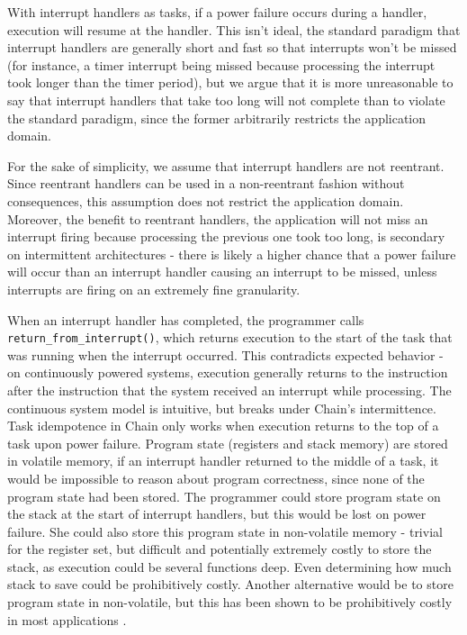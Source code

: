 \documentclass[11pt]{sensys-proc}
\newcommand{\chain}{Chain\xspace}
\begin{document}
With interrupt handlers as tasks, if a power failure occurs during a
handler, execution will resume at the handler. This isn't ideal, the
standard paradigm that interrupt handlers are generally short and fast
so that interrupts won't be missed (for instance, a timer interrupt
being missed because processing the interrupt took longer than the
timer period), but we argue that it is more unreasonable to say
that interrupt handlers that take too long will not complete than
to violate the standard paradigm, since the former arbitrarily restricts
the application domain.


For the sake of simplicity, we assume that interrupt handlers are not
reentrant. Since reentrant handlers can be used in a non-reentrant fashion
without consequences, this assumption does not restrict the application domain.
Moreover, the benefit to reentrant handlers, the application will not miss an
interrupt firing because processing the previous one took too long, is
secondary on intermittent architectures - there is likely a higher chance that
a power failure will occur than an interrupt handler causing an interrupt to be
missed, unless interrupts are firing on an extremely fine granularity.


When an interrupt handler has completed, the programmer calls
\texttt{return\_from\_interrupt()}, which returns execution to the start
of the task that was running when the interrupt occurred. This contradicts
expected behavior - on continuously powered systems, execution generally
returns to the instruction after the instruction that the system received an
interrupt while processing. The continuous system model is intuitive, but
breaks under \chain's intermittence. Task idempotence in \chain only works
when execution returns to the top of a task upon power failure. Program state
(registers and stack memory) are stored
in volatile memory, if an interrupt handler returned to the middle of a task,
it would be impossible to reason about program correctness, since none of the
program state had been stored. The programmer could store program state on the
stack at the start of interrupt handlers, but this would be lost on power
failure. She could also store this program state in non-volatile memory -
trivial for the register set, but difficult and potentially extremely costly to
store the stack, as execution could be several functions deep. Even determining
how much stack to save could be prohibitively costly. Another alternative would
be to store program state in non-volatile, but this has been shown to be
prohibitively costly in most applications \cite{Aware}.
\end{document}
